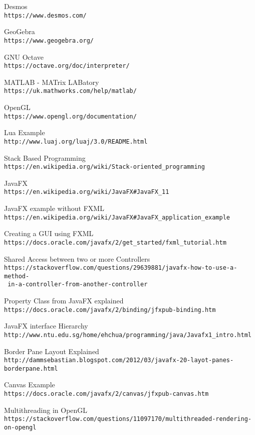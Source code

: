 \documentclass[../../main.tex]{subfiles}
\begin{document}
\begin{thebibliography}{9}

Desmos\\
\texttt{https://www.desmos.com/}

GeoGebra\\
\texttt{https://www.geogebra.org/}

GNU Octave\\
\texttt{https://octave.org/doc/interpreter/}

MATLAB - MATrix LABatory\\
\texttt{https://uk.mathworks.com/help/matlab/}

OpenGL\\
\texttt{https://www.opengl.org/documentation/}

Lua Example\\
\texttt{http://www.luaj.org/luaj/3.0/README.html}

Stack Based Programming\\
\texttt{https://en.wikipedia.org/wiki/Stack-oriented\_programming}

JavaFX\\
\texttt{https://en.wikipedia.org/wiki/JavaFX\#JavaFX\_11}

JavaFX example without FXML\\
\texttt{https://en.wikipedia.org/wiki/JavaFX\#JavaFX\_application\_example}

Creating a GUI using FXML\\
\texttt{https://docs.oracle.com/javafx/2/get\_started/fxml\_tutorial.htm}

Shared Access between two or more Controllers\\
\texttt{https://stackoverflow.com/questions/29639881/javafx-how-to-use-a-method-\\\ in-a-controller-from-another-controller}

Property Class from JavaFX explained\\
\texttt{https://docs.oracle.com/javafx/2/binding/jfxpub-binding.htm}

JavaFX interface Hierarchy\\
\texttt{http://www.ntu.edu.sg/home/ehchua/programming/java/Javafx1\_intro.html}

Border Pane Layout Explained\\
\texttt{http://dammsebastian.blogspot.com/2012/03/javafx-20-layot-panes-borderpane.html}

Canvas Example\\
\texttt{https://docs.oracle.com/javafx/2/canvas/jfxpub-canvas.htm}

Multithreading in OpenGL\\
\texttt{https://stackoverflow.com/questions/11097170/multithreaded-rendering-on-opengl}

\end{thebibliography}
\end{document}
